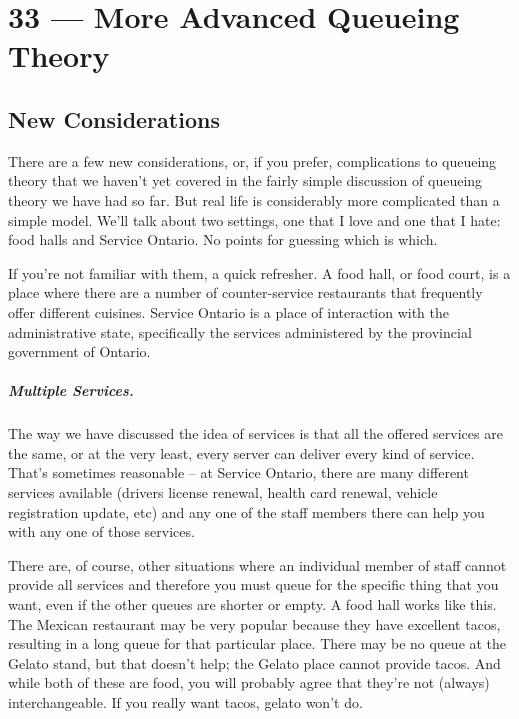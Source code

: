 \documentclass[a4paper]{report}
\begin{document}
\chapter*{33 --- More Advanced Queueing Theory}


\section*{New Considerations}

There are a few new considerations, or, if you prefer, complications to queueing theory that we haven't yet covered in the fairly simple discussion of queueing theory we have had so far. But real life is considerably more complicated than a simple model. We'll talk about two settings, one that I love and one that I hate: food halls and Service Ontario. No points for guessing which is which.

If you're not familiar with them, a quick refresher. A food hall, or food court, is a place where there are a number of counter-service restaurants that frequently offer different cuisines. Service Ontario is a place of interaction with the administrative state, specifically the services administered by the provincial government of Ontario.

\paragraph{Multiple Services.} The way we have discussed the idea of services is that all the offered services are the same, or at the very least, every server can deliver every kind of service. That's sometimes reasonable -- at Service Ontario, there are many different services available (drivers license renewal, health card renewal, vehicle registration update, etc) and any one of the staff members there can help you with any one of those services.

There are, of course, other situations where an individual member of staff cannot provide all services and therefore you must queue for the specific thing that you want, even if the other queues are shorter or empty. A food hall works like this. The Mexican restaurant may be very popular because they have excellent tacos, resulting in a long queue for that particular place. There may be no queue at the Gelato stand, but that doesn't help; the Gelato place cannot provide tacos. And while both of these are food, you will probably agree that they're not (always) interchangeable. If you really want tacos, gelato won't do.
\end{document}
